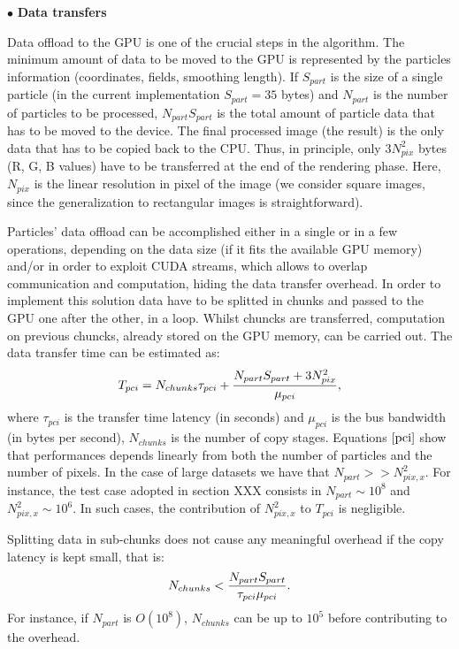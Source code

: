 \documentclass[11pt]{article}
\begin{document}
\noindent$\bullet$ {\bf Data transfers}

Data offload to the GPU is one of the crucial steps in the algorithm. 
The minimum amount of data 
to be moved to the GPU is represented by the particles information 
(coordinates, fields, smoothing length). If $S_{part}$ is the
size of a single particle (in the current implementation $S_{part}=35$ bytes) and 
$N_{part}$ is the number of particles to be processed,
$N_{part} S_{part}$ is the total amount of particle data that has to be moved to the device.
The final processed image (the result) is the only data that has to be copied back to
the CPU. Thus, in principle, only $3 N_{pix}^2$ bytes (R, G, B values) have to be transferred at
the end of the rendering phase. Here, $N_{pix}$ is the linear resolution in pixel of the 
image (we consider square images, since the generalization to rectangular images is
straightforward). 

Particles' data offload can be accomplished either in a single or in a few operations, 
depending on the data size (if it fits the available GPU memory) and/or
in order to exploit CUDA streams, which allows to overlap communication 
and computation, hiding the data transfer overhead.  
In order to implement this solution data have to be
splitted in chunks and passed to the GPU one after the other, in a loop. Whilst chuncks 
are transferred, computation on previous chuncks, already stored on the GPU
memory, can be carried out. 
The data transfer time can be estimated as:
\begin{equation}\label{pci}
T_{pci} =  N_{chunks} \tau_{pci} + {N_{part} S_{part} + 3 N_{pix}^2 \over 
\mu_{pci}},
\end{equation}
where $\tau_{pci}$ is the transfer time latency (in seconds) and $\mu_{pci}$ is the
bus bandwidth (in bytes per second), $N_{chunks}$ is the number 
of copy stages. 
Equations $\eqref{pci}$ show that performances
depends linearly from both the number of particles and the number of pixels.
In the case of large datasets we have that
$N_{part} >> N_{pix,x}^2$. For instance, the test case adopted
in section XXX consists in $N_{part} \sim 10^8$
and $N_{pix,x}^2 \sim 10^6$. In such cases, the contribution of $N_{pix,x}^2$
to $T_{pci}$ is negligible.

Splitting data in sub-chunks does not
cause any meaningful overhead if the copy latency is kept small, that is:
\begin{equation}
N_{chunks} < {N_{part} S_{part}\over \tau_{pci}\mu_{pci}}.
\end{equation}
For instance, if $N_{part}$ is $O(10^8)$, $N_{chunks}$ can be up to $10^5$ before
contributing to the overhead.
\end{document}
